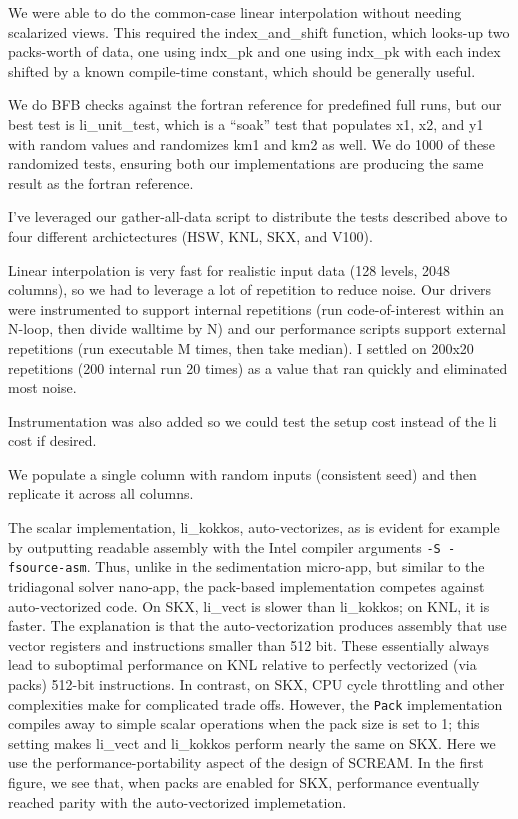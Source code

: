 \documentclass[10pt,twocolumn]{article}
\begin{document}
We were able to do the common-case linear interpolation without needing scalarized
views. This required the index\_and\_shift function, which looks-up two packs-worth
of data, one using indx\_pk and one using indx\_pk with each index shifted by a known
compile-time constant, which should be generally useful.


We do BFB checks against the fortran reference for predefined full runs, but our best test is
li\_unit\_test, which is a ``soak'' test that populates x1, x2, and y1 with random
values and randomizes km1 and km2 as well. We do 1000 of these randomized tests,
ensuring both our implementations are producing the same result as the fortran reference.

I've leveraged our gather-all-data script to distribute the tests described above to four different
archictectures (HSW, KNL, SKX, and V100).


Linear interpolation is very fast for realistic input data (128 levels, 2048 columns), so we
had to leverage a lot of repetition to reduce noise. Our drivers were instrumented to support
internal repetitions (run code-of-interest within an N-loop, then divide walltime by N) and our performance scripts
support external repetitions (run executable M times, then take median). I settled on
200x20 repetitions (200 internal run 20 times) as a value that ran quickly and eliminated
most noise.

Instrumentation was also added so we could test the setup cost instead of the li cost
if desired.

We populate a single column with random inputs (consistent seed) and then replicate it
across all columns.


The scalar implementation, li\_kokkos, auto-vectorizes, as is evident
for example by outputting readable assembly with the Intel compiler
arguments {\tt -S -fsource-asm}.  Thus, unlike in the sedimentation
micro-app, but similar to the tridiagonal solver nano-app, the
pack-based implementation competes against auto-vectorized code.  On
SKX, li\_vect is slower than li\_kokkos; on KNL, it is faster.  The
explanation is that the auto-vectorization produces assembly that use
vector registers and instructions smaller than 512 bit.  These
essentially always lead to suboptimal performance on KNL relative to
perfectly vectorized (via packs) 512-bit instructions.  In contrast,
on SKX, CPU cycle throttling and other complexities make for
complicated trade offs.  However, the {\tt Pack} implementation
compiles away to simple scalar operations when the pack size is set to
1; this setting makes li\_vect and li\_kokkos perform nearly the same
on SKX.  Here we use the performance-portability aspect of the design
of SCREAM. In the first figure, we see that, when packs are enabled
for SKX, performance eventually reached parity with the
auto-vectorized implemetation.
\end{document}
